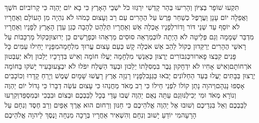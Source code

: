 \documentclass[../main/main.tex]{subfiles}
\begin{document}
\begin{multicols*}{\ncols}
תִּקְעוּ שׁוֹפָר בְּצִיּוֹן וְהָרִיעוּ בְּהַר קָדְשִׁי יִרְגְּזוּ כֹּל יֹשְׁבֵי הָאָרֶץ כִּי בָא יוֹם יַהְוֶה כִּי קָרוֹב\PreVerseSpace{}יוֹם חֹשֶׁךְ וַאֲפֵלָה יוֹם עָנָן וַעֲרָפֶל כְּשַׁחַר פָּרֻשׂ עַל הֶהָרִים עַם רַב וְעָצוּם כָּמֹהוּ לֹא נִהְיָה מִן הָעוֹלָם וְאַחֲרָיו לֹא יוֹסֵף עַד שְׁנֵי דּוֹר וָדוֹר\PreVerseSpace{}לְפָנָיו אָכְלָה אֵשׁ וְאַחֲרָיו תְּלַהֵט לֶהָבָה כְּגַן עֵדֶן הָאָרֶץ לְפָנָיו וְאַחֲרָיו מִדְבַּר שְׁמָמָה וְגַם פְּלֵיטָה לֹא הָיְתָה לּוֹ\PreVerseSpace{}כְּמַרְאֵה סוּסִים מַרְאֵהוּ וּכְפָרָשִׁים כֵּן יְרוּצוּן\PreVerseSpace{}כְּקוֹל מַרְכָּבוֹת עַל רָאשֵׁי הֶהָרִים יְרַקֵּדוּן כְּקוֹל לַהַב אֵשׁ אֹכְלָה קָשׁ כְּעַם עָצוּם עֱרוּךְ מִלְחָמָה\PreVerseSpace{}מִפָּנָיו יָחִילוּ עַמִּים כָּל פָּנִים קִבְּצוּ פָארוּר\PreVerseSpace{}כְּגִבּוֹרִים יְרֻצוּן כְּאַנְשֵׁי מִלְחָמָה יַעֲלוּ חוֹמָה וְאִישׁ בִּדְרָכָיו יֵלֵכוּן וְלֹא יְעַבְּטוּן אֹרְחוֹתָם\PreVerseSpace{}וְאִישׁ אָחִיו לֹא יִדְחָקוּן גֶּבֶר בִּמְסִלָּתוֹ יֵלֵכוּן וּבְעַד הַשֶּׁלַח יִפֹּלוּ לֹא יִבְצָעוּ\PreVerseSpace{}בָּעִיר יָשֹׁקּוּ בַּחוֹמָה יְרֻצוּן בַּבָּתִּים יַעֲלוּ בְּעַד הַחַלּוֹנִים יָבֹאוּ כַּגַּנָּב\PreVerseSpace{}לְפָנָיו רָגְזָה אֶרֶץ רָעֲשׁוּ שָׁמָיִם שֶׁמֶשׁ וְיָרֵחַ קָדָרוּ וְכוֹכָבִים אָסְפוּ נָגְהָם\PreVerseSpace{}וַיהוָה נָתַן קוֹלוֹ לִפְנֵי חֵילוֹ כִּי רַב מְאֹד מַחֲנֵהוּ כִּי עָצוּם עֹשֵׂה דְבָרוֹ כִּי גָדוֹל יוֹם יַהְוֶה וְנוֹרָא מְאֹד וּמִי יְכִילֶנּוּ\PreVerseSpace{}וְגַם עַתָּה נְאֻם יַהְוֶה שֻׁבוּ עָדַי בְּכָל לְבַבְכֶם וּבְצוֹם וּבִבְכִי וּבְמִסְפֵּד\PreVerseSpace{}וְקִרְעוּ לְבַבְכֶם וְאַל בִּגְדֵיכֶם וְשׁוּבוּ אֶל יַהְוֶה אֱלֹהֵיכֶם כִּי חַנּוּן וְרַחוּם הוּא אֶרֶךְ אַפַּיִם וְרַב חֶסֶד וְנִחָם עַל הָרָעָה\PreVerseSpace{}מִי יוֹדֵעַ יָשׁוּב וְנִחָם וְהִשְׁאִיר אַחֲרָיו בְּרָכָה מִנְחָה וָנֶסֶךְ לַיהוָה אֱלֹהֵיכֶם\OpenSection{}\par

\end{multicols*}
\end{document}
